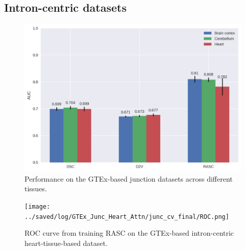 

%	




	
	
	

\subsection{Intron-centric datasets} \label{subsec:gtex_junc}

\begin{figure}[h]
	\centering\includegraphics[width=1\textwidth]{../visualizations/ch5-results/gtex_junc_barcharts.png} 
	\caption{Performance on the GTEx-based junction datasets across different tissues. }
	\label{fig:gtex_junc_barcharts}
\end{figure}


\begin{figure}[h]
	\texttt{[image: ../saved/log/GTEx\_Junc\_Heart\_Attn/junc\_cv\_final/ROC.png]}
	\caption{ROC curve from training RASC on the GTEx-based intron-centric heart-tissue-based dataset. }
	\label{fig:gtex_junc_rocs}
\end{figure}

